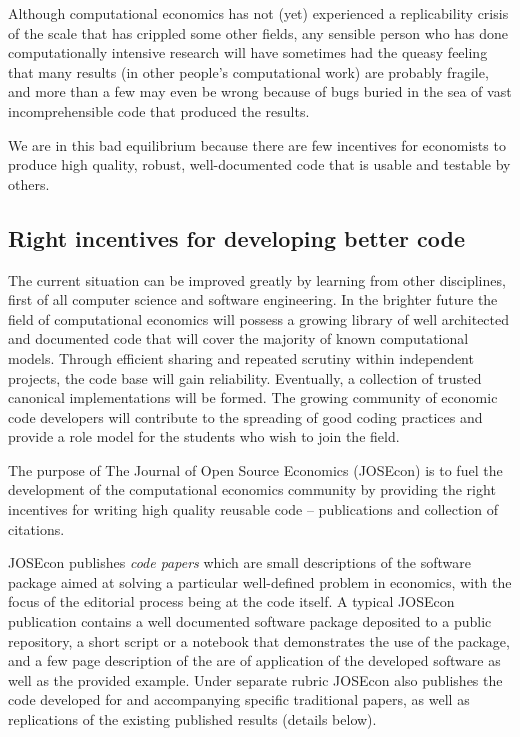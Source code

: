 Although computational economics has not (yet) experienced a replicability crisis of the scale that has crippled some other fields, any sensible person who has done computationally intensive research will have sometimes had the queasy feeling that many results (in other people's computational work) are probably fragile, and more than a few may even be wrong because of bugs buried in the sea of vast incomprehensible code that produced the results.

We are in this bad equilibrium because there are few incentives for economists to produce high quality, robust, well-documented code that is usable and testable by others.


\subsection{Right incentives for developing better code}

The current situation can be improved greatly by learning from other disciplines,
first of all computer science and software engineering.
In the brighter future the field of computational economics will possess a growing library 
of well architected and documented code that will cover the majority of known 
computational models.
Through efficient sharing and repeated scrutiny within independent projects,
the code base will gain reliability. Eventually, a collection of trusted canonical
implementations will be formed.
The growing community of economic code developers will contribute to the spreading 
of good coding practices and provide a role model for the students who wish to join the field.


The purpose of The Journal of Open Source Economics (JOSEcon) is to fuel the 
development of the computational economics community by providing the right incentives
for writing high quality reusable code -- publications and collection of citations.

JOSEcon publishes \emph{code papers} which are small descriptions of the software package
aimed at solving a particular well-defined problem in economics, with the focus
of the editorial process being at the code itself.
A typical JOSEcon publication contains a well documented software package deposited to
a public repository, a short script or a notebook that demonstrates the use of the 
package, and a few page description of the are of application of the developed software
as well as the provided example.
Under separate rubric JOSEcon also publishes the code developed for and accompanying 
specific traditional papers, as well as replications of the existing published results 
(details below).

